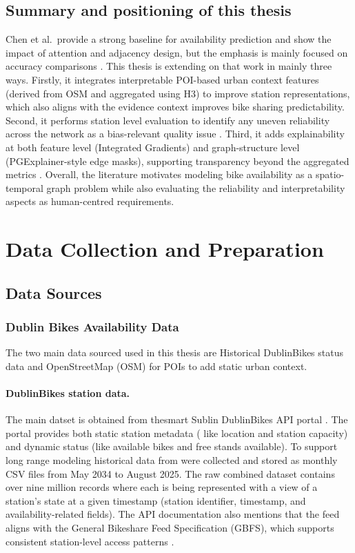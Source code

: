 \documentclass[11pt]{report}
\begin{document}
\section{Summary and positioning of this thesis}
Chen et al.\ provide a strong baseline for availability prediction and show the impact of attention and adjacency design, but the emphasis is mainly focused on accuracy comparisons \cite{chen2021comparative}. This thesis is extending on that work in mainly three ways. Firstly, it integrates interpretable POI-based urban context features (derived from OSM and aggregated using H3) to improve station representations, which also aligns with the evidence context improves bike sharing predictability. Second, it performs station level evaluation to identify any uneven reliability across the network as a bias-relevant quality issue \cite{yan2020fairness,zheng2021equality}. Third, it adds explainability at both feature level (Integrated Gradients) and graph-structure level (PGExplainer-style edge masks), supporting transparency beyond the aggregated metrics \cite{sundararajan2017ig,luo2020pgexplainer}. Overall, the literature motivates modeling bike availability as a spatio-temporal graph problem while also evaluating the reliability and interpretability aspects as human-centred requirements.

\chapter{Data Collection and Preparation}

\section{Data Sources}
\subsection{Dublin Bikes Availability Data}
The two main data sourced used in this thesis are Historical DublinBikes status data and OpenStreetMap (OSM) for POIs to add static urban context.


\subsubsection{DublinBikes station data.} The main datset is obtained from thesmart Sublin DublinBikes API portal \cite{smartdublin_dublinbikes_api}. The portal provides both static station metadata ( like location and station capacity) and dynamic status (like available bikes and free stands available)\cite{smartdublin_dublinbikes_api_resource}. To support long range modeling historical data from were collected and stored as monthly CSV files from May 2034 to August 2025. The raw combined dataset contains over nine million records where each is being represented with a view of a station's state at a given timestamp (station identifier, timestamp, and availability-related fields). The API documentation also mentions that the feed aligns with the General Bikeshare Feed Specification (GBFS), which supports consistent station-level access patterns \cite{smartdublin_dublinbikes_api}.
\end{document}

